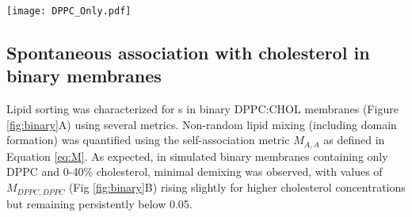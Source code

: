 \begin{figure*}[h!]
	\center
	\texttt{[image: DPPC\_Only.pdf]}
	\caption{nAChR boundary lipids in binary mixtures of DPPC and CHOL. A: Representative frame from a simulated trajectory of a single nAChR embedded in a small membrane, colored by subunit ($\alpha$:green, $\beta$:purple, $\delta$:gray, $\gamma$:cyan) in a 4:1 DPPC (blue):Chol (red) mixture.  B: Extent of demixing ($M_{DPPC,DPPC}$ defined in Eq. \ref{eq:M}) and depletion of saturated lipids from the boundary ($\qsat$ defined in Eq.\ref{eq:Q}) in small binary membranes. In this binary system, cholesterol depletion/enrichment is directly related to the saturated lipid depletion/enrichment: $Q_\mathrm{chol}=-x_{\mathrm{sat}} \qsat/\xch$.  Error bars represent standard error for a blocking average over 50 ns. C: Average normalized density (Eq. \ref{eq:Rt}) of cholesterol for the system in A. Plot shown is identical to Figure \ref{fig:sorting} in ``Chol'' row, ``None'' column, but has been cropped and zoomed around the protein center.}
	\label{fig:binary}
\end{figure*} 
\subsection {Spontaneous association with cholesterol in binary membranes} \label{binary}

Lipid sorting was characterized for \nachr s in binary DPPC:CHOL membranes (Figure \ref{fig:binary}A)  using several metrics. 
Non-random lipid mixing (including domain formation) was quantified using the self-association metric $M_{A,A}$ as defined in Equation \ref{eq:M}. %
As expected, in simulated binary membranes containing only DPPC and 0-40\% cholesterol, minimal demixing was observed, with values of $M_{DPPC,DPPC}$ (Fig \ref{fig:binary}B) rising slightly for higher cholesterol concentrations but remaining persistently below 0.05.  %

